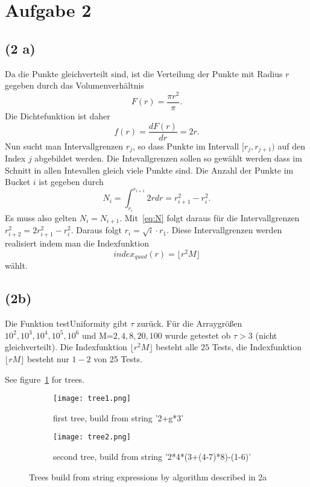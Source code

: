 \documentclass[a4paper]{article}
\begin{document}
\section*{Aufgabe 2}
\subsection*{(2 a)}
Da die Punkte gleichverteilt sind, ist die Verteilung der Punkte mit Radius $r$ gegeben durch das Volumenverhältnis 
\begin{equation}
F(r)=\frac{\pi r^2}{\pi}.
\end{equation}
Die Dichtefunktion ist daher
\begin{equation}
f(r)=\frac{dF(r)}{dr}=2r.
\end{equation}
Nun sucht man Intervallgrenzen $r_j$, so dass Punkte im Intervall $[r_j,r_{j+1})$ auf den Index $j$ abgebildet werden. Die Intevallgrenzen sollen so gewählt werden dass im Schnitt in allen Intevallen gleich viele Punkte sind.
Die Anzahl der Punkte im Bucket $i$ ist gegeben durch
\begin{equation}
N_i = \int_{r_i}^{r_{i+1}}2r dr = r_{i+1}^2-r_i^2.\label{eq:N}
\end{equation}
Es muss also gelten $N_i=N_{i+1}$. Mit~\eqref{eq:N} folgt daraus für die Intervallgrenzen $r_{i+2}^2=2r_{i+1}^2-r_i^2$. Daraus folgt $r_i=\sqrt{i}\cdot r_1$. Diese Intervallgrenzen werden realisiert indem man die Indexfunktion
\begin{equation}
index_{quad}(r)=\lfloor r^2M\rfloor
\end{equation}
wählt.

\subsection*{(2b)}
Die Funktion testUniformity gibt $\tau$ zurück. Für die Arraygrößen $10^2,10^3,10^4,10^5,10^6$ und M=$2,4,8,20,100$ wurde getestet ob $\tau>3$ (nicht gleichverteilt). Die Indexfunktion $\lfloor r^2M\rfloor$ besteht alle $25$ Tests, die Indexfunktion $\lfloor rM\rfloor$ besteht nur $1-2$ von 25 Tests.


See figure~\ref{fig:trees} for trees.

\begin{figure}
  \begin{subfigure}[b]{0.5\textwidth}
    \centering
    \texttt{[image: tree1.png]}
    \caption{first tree, build from string '2+g*3'}
  \end{subfigure}
  \begin{subfigure}[b]{0.5\textwidth}
    \texttt{[image: tree2.png]}
    \caption{second tree, build from string '2*4*(3+(4-7)*8)-(1-6)'}
  \end{subfigure}
  \caption{Trees build from string expressions by algorithm described in 2a}
  \label{fig:trees}
\end{figure}
\end{document}
